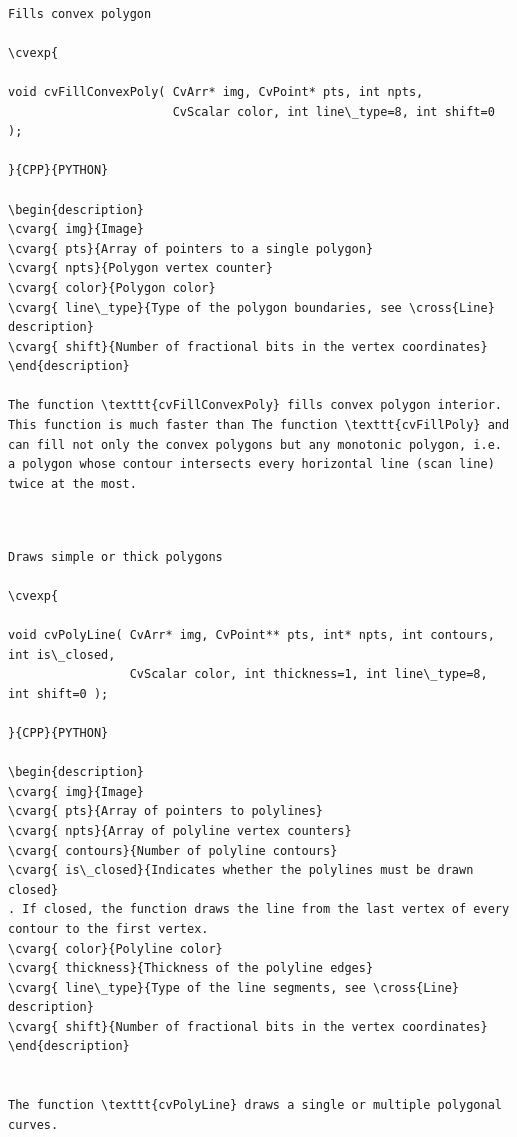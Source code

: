 \label{FillConvexPoly}
\begin{verbatim}

Fills convex polygon

\cvexp{

void cvFillConvexPoly( CvArr* img, CvPoint* pts, int npts,
                       CvScalar color, int line\_type=8, int shift=0 );

}{CPP}{PYTHON}

\begin{description}
\cvarg{ img}{Image}
\cvarg{ pts}{Array of pointers to a single polygon}
\cvarg{ npts}{Polygon vertex counter}
\cvarg{ color}{Polygon color}
\cvarg{ line\_type}{Type of the polygon boundaries, see \cross{Line} description}
\cvarg{ shift}{Number of fractional bits in the vertex coordinates}
\end{description}

The function \texttt{cvFillConvexPoly} fills convex polygon interior. This function is much faster than The function \texttt{cvFillPoly} and can fill not only the convex polygons but any monotonic polygon, i.e. a polygon whose contour intersects every horizontal line (scan line) twice at the most.


\end{verbatim}
\label{PolyLine}
\begin{verbatim}

Draws simple or thick polygons

\cvexp{

void cvPolyLine( CvArr* img, CvPoint** pts, int* npts, int contours, int is\_closed,
                 CvScalar color, int thickness=1, int line\_type=8, int shift=0 );

}{CPP}{PYTHON}

\begin{description}
\cvarg{ img}{Image}
\cvarg{ pts}{Array of pointers to polylines}
\cvarg{ npts}{Array of polyline vertex counters}
\cvarg{ contours}{Number of polyline contours}
\cvarg{ is\_closed}{Indicates whether the polylines must be drawn closed}
. If closed, the function draws the line from the last vertex of every contour to the first vertex.
\cvarg{ color}{Polyline color}
\cvarg{ thickness}{Thickness of the polyline edges}
\cvarg{ line\_type}{Type of the line segments, see \cross{Line} description}
\cvarg{ shift}{Number of fractional bits in the vertex coordinates}
\end{description}


The function \texttt{cvPolyLine} draws a single or multiple polygonal curves.


\end{verbatim}
